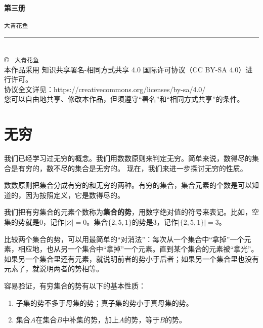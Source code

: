 \documentclass[12pt,UTF8,fontset=none]{ctexbook}
\newcommand{\mytitle}{第三册}
\newcommand{\myauthor}{大青花鱼}
\begin{document}
\cleardoublepage                %
\thispagestyle{empty}           %
\begin{center}
    \vspace*{2cm}               %
    
    { \bfseries \mytitle}
    
    \vspace{1cm}              %
    
    { \texttt{\myauthor}}
    
    \vfill                      %
    
    \rule{0.5\textwidth}{0.4pt} \\[0.5cm]
    
    {\scriptsize
    \copyright\ \the\year{} \texttt{\myauthor} \\[0.2cm]
    本作品采用 知识共享署名-相同方式共享 4.0 国际许可协议（CC BY-SA 4.0）进行许可。\\
    协议全文详见：https://creativecommons.org/licenses/by-sa/4.0/ \\
    您可以自由地共享、修改本作品，但须遵守“署名”和“相同方式共享”的条件。
    }
\end{center}
\newpage   
\tableofcontents
\newpage

\chapter{无穷}

我们已经学习过无穷的概念。我们用数数原则来判定无穷。简单来说，数得尽的集合是有穷的，数不尽的集合是无穷的。
现在，我们来进一步探讨无穷的性质。

数数原则把集合分成有穷的和无穷的两种。有穷的集合，集合元素的个数是可以知道的，因为按照定义，它是数得尽的。

我们把有穷集合的元素个数称为\textbf{集合的势}，用数字绝对值的符号来表记。比如，空集的势就是$0$，记作$|\varnothing| = 0$。集合$\{2,5,1\}$的势是$3$，记作$|\{2, 5, 1\}| = 3$。

比较两个集合的势，可以用最简单的“对消法”：每次从一个集合中“拿掉”一个元素，相应地，也从另一个集合中“拿掉”一个元素。直到某个集合的元素被“拿光”。如果另一个集合里还有元素，就说明前者的势小于后者；如果另一个集合里也没有元素了，就说明两者的势相等。

容易验证，有穷集合的势有以下的基本性质：
\begin{enumerate}
    \item 子集的势不多于母集的势；真子集的势小于真母集的势。
    \item 集合$A$在集合$B$中补集的势，加上$A$的势，等于$B$的势。
\end{enumerate}
\end{document}
